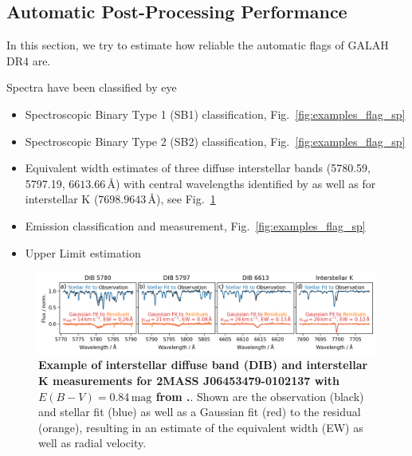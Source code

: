 \documentclass[
  journal=pasa,
  manuscript=research-paper, %
  year=2023,
  volume=37
]{cup-journal}
\begin{document}
\subsection{Automatic Post-Processing Performance}

In this section, we try to estimate how reliable the automatic flags of GALAH DR4 are.

Spectra have been classified by eye

\begin{itemize}
    \item Spectroscopic Binary Type 1 (SB1) classification, Fig.~\ref{fig:examples_flag_sp}
    \item Spectroscopic Binary Type 2 (SB2) classification, Fig.~\ref{fig:examples_flag_sp}
    \item Equivalent width estimates of three diffuse interstellar bands (5780.59, 5797.19, $6613.66\,\text{\AA}$) with central wavelengths identified by \citet{Vogrincic2023} as well as for interstellar K ($7698.9643\,\text{\AA}$), see Fig.~\ref{fig:example_dibs_06453479-0102137}
    \item Emission classification and measurement, Fig.~\ref{fig:examples_flag_sp}
    \item Upper Limit estimation
\end{itemize}

\begin{figure}[hbt]
 \centering
 \includegraphics[width=\textwidth]{figures/example_dibs_06453479-0102137.png}
 \caption{\textbf{Example of interstellar diffuse band (DIB) and interstellar K measurements for 2MASS J06453479-0102137 with $E(B-V) = 0.84\,\mathrm{mag}$ from \citet{Schlegel1998}.}. Shown are the observation (black) and stellar fit (blue) as well as a Gaussian fit (red) to the residual (orange), resulting in an estimate of the equivalent width (EW) as well as radial velocity.} %
 \label{fig:example_dibs_06453479-0102137}
\end{figure}




\newpage
\end{document}
